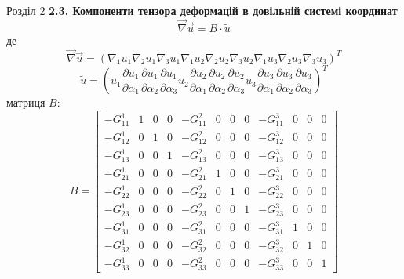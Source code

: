 \documentclass[8pt]{beamer}
\numberwithin{figure}{section}
\numberwithin{equation}{section}
\begin{document}
\begin{frame}{Розділ 2}
\textbf{2.3. Компоненти тензора деформацій в довільній системі координат}
\begin{equation}
\vec{\nabla} \vec{u} =  
B \cdot \tilde{u}
\end{equation}
де \\
\begin{equation}
\vec{\nabla} \vec{u} =  \left(
\nabla_1 u_1  \nabla_2 u_1  \nabla_3 u_1 \nabla_1 u_2  \nabla_2 u_2  \nabla_3 u_2 
\nabla_1 u_3  \nabla_2 u_3  \nabla_3 u_3 
\right)^T
\end{equation}
\begin{equation}
 \tilde{u} =  \left( u_1 
\frac { \partial u_1 } { \partial \alpha_1} 
\frac { \partial u_1 } { \partial \alpha_2} 
\frac { \partial u_1 } { \partial \alpha_3} 
u_2 
\frac { \partial u_2 } { \partial \alpha_1} 
\frac { \partial u_2 } { \partial \alpha_2} 
\frac { \partial u_2 } { \partial \alpha_3} 
u_3 
\frac { \partial u_3 } { \partial \alpha_1} 
\frac { \partial u_3 } { \partial \alpha_2} 
\frac { \partial u_3 } { \partial \alpha_3} 
\right)^T
\end{equation}
матриця $B$:
\begin{equation}\label{eq:matrixB}
B=
\left[\begin{array}{cccccccccccc}
-G_{11}^1 & 1 & 0 & 0 & -G_{11}^2 & 0 & 0 & 0 & -G_{11}^3 & 0 & 0 & 0\\
-G_{12}^1 & 0 & 1 & 0 & -G_{12}^2 & 0 & 0 & 0 & -G_{12}^3 & 0 & 0 & 0\\
-G_{13}^1 & 0 & 0 & 1 & -G_{13}^2 & 0 & 0 & 0 & -G_{13}^3 & 0 & 0 & 0\\
-G_{21}^1 & 0 & 0 & 0 & -G_{21}^2 & 1 & 0 & 0 & -G_{21}^3 & 0 & 0 & 0\\
-G_{22}^1 & 0 & 0 & 0 & -G_{22}^2 & 0 & 1 & 0 & -G_{22}^3 & 0 & 0 & 0\\
-G_{23}^1 & 0 & 0 & 0 & -G_{23}^2 & 0 & 0 & 1 & -G_{23}^3 & 0 & 0 & 0\\
-G_{31}^1 & 0 & 0 & 0 & -G_{31}^2 & 0 & 0 & 0 & -G_{31}^3 & 1 & 0 & 0\\
-G_{32}^1 & 0 & 0 & 0 & -G_{32}^2 & 0 & 0 & 0 & -G_{32}^3 & 0 & 1 & 0\\
-G_{33}^1 & 0 & 0 & 0 & -G_{33}^2 & 0 & 0 & 0 & -G_{33}^3 & 0 & 0 & 1
\end{array}\right]
\end{equation}

\end{frame}
\end{document}
